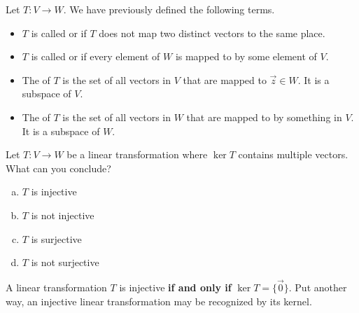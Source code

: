 \begin{applicationActivities}

\begin{observation}
Let \(T: V \rightarrow W\).  We have previously defined the following
terms.
\begin{itemize}
\item  \(T\) is called  or  if \(T\) does not map two distinct vectors to the same place.
\item \(T\) is called  or  if every element of \(W\) is mapped to by some element of \(V\).
\item The  of \(T\) is the set of all vectors in \(V\) that are mapped to $\vec{z}\in W$.  It is a subspace of \(V\).
\item The  of \(T\) is the set of all vectors in \(W\) that are mapped to by something in \(V\).  It is a subspace of \(W\).
\end{itemize}
\end{observation}

\begin{activity}{5}
Let \(T: V \rightarrow W\) be a linear transformation where
\(\ker T\) contains multiple vectors. What can you conclude?
\begin{enumerate}[(a)]
\item \(T\) is injective
\item \(T\) is not injective
\item \(T\) is surjective
\item \(T\) is not surjective
\end{enumerate}
\end{activity}

\begin{fact}
A linear transformation $T$ is injective \textbf{if and only if} $\ker T = \{\vec{0}\}$. Put another way, an injective linear transformation may be
recognized by its  kernel.


\end{fact}
\end{applicationActivities}
